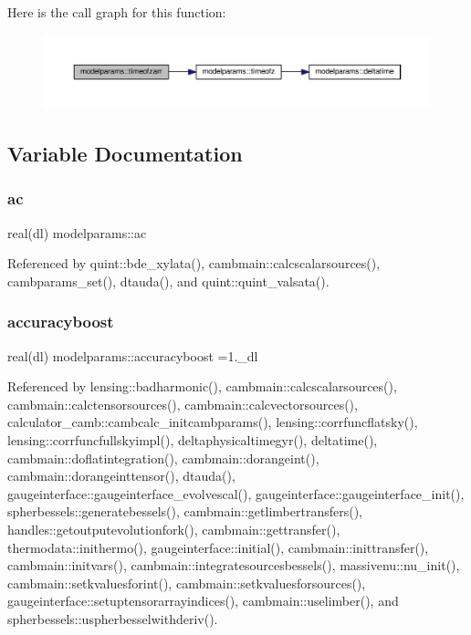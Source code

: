 Here is the call graph for this function\+:
\nopagebreak
\begin{figure}[H]
\begin{center}
\leavevmode
\includegraphics[width=350pt]{namespacemodelparams_aa9fc9f952c72345785fa69b491e598d5_cgraph}
\end{center}
\end{figure}


\subsection{Variable Documentation}
\mbox{\label{namespacemodelparams_ae997a7c4aa08ef8490836137c26170f1}} 
\subsubsection{\texorpdfstring{ac}{ac}}
{\footnotesize\ttfamily real(dl) modelparams\+::ac}



Referenced by quint\+::bde\+\_\+xylata(), cambmain\+::calcscalarsources(), cambparams\+\_\+set(), dtauda(), and quint\+::quint\+\_\+valsata().

\mbox{\label{namespacemodelparams_abb9bb8b33d3369c3a551e3d4531133e1}} 
\subsubsection{\texorpdfstring{accuracyboost}{accuracyboost}}
{\footnotesize\ttfamily real(dl) modelparams\+::accuracyboost =1.\+\_\+dl}



Referenced by lensing\+::badharmonic(), cambmain\+::calcscalarsources(), cambmain\+::calctensorsources(), cambmain\+::calcvectorsources(), calculator\+\_\+camb\+::cambcalc\+\_\+initcambparams(), lensing\+::corrfuncflatsky(), lensing\+::corrfuncfullskyimpl(), deltaphysicaltimegyr(), deltatime(), cambmain\+::doflatintegration(), cambmain\+::dorangeint(), cambmain\+::dorangeinttensor(), dtauda(), gaugeinterface\+::gaugeinterface\+\_\+evolvescal(), gaugeinterface\+::gaugeinterface\+\_\+init(), spherbessels\+::generatebessels(), cambmain\+::getlimbertransfers(), handles\+::getoutputevolutionfork(), cambmain\+::gettransfer(), thermodata\+::inithermo(), gaugeinterface\+::initial(), cambmain\+::inittransfer(), cambmain\+::initvars(), cambmain\+::integratesourcesbessels(), massivenu\+::nu\+\_\+init(), cambmain\+::setkvaluesforint(), cambmain\+::setkvaluesforsources(), gaugeinterface\+::setuptensorarrayindices(), cambmain\+::uselimber(), and spherbessels\+::uspherbesselwithderiv().

